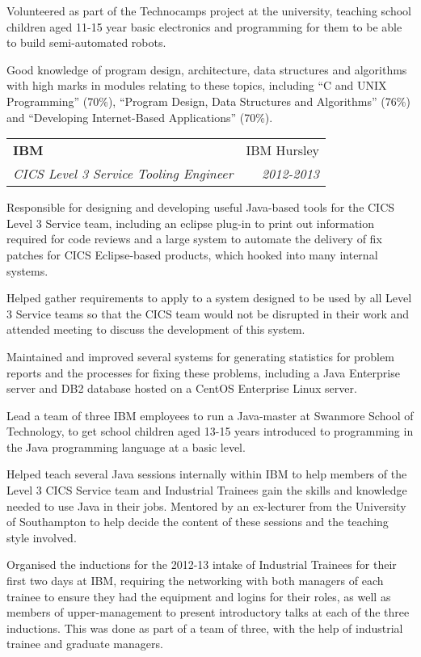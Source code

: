 \documentclass[letterpaper,11pt]{article}
\makeatletter
\newlength{\outerbordwidth}
\newcommand{\resheading}[1]{\vspace{8pt}
  \parbox{\textwidth}{\setlength{\FrameSep}{\outerbordwidth}
    \begin{shaded}
\setlength{\fboxsep}{0pt}\framebox[\textwidth][l]{\setlength{\fboxsep}{4pt}\fcolorbox{shadecolorB}{shadecolorB}{\textbf{\sffamily{\mbox{~}\makebox[6.762in][l]{\large #1} \vphantom{p\^{E}}}}}}
    \end{shaded}
  }\vspace{-5pt}
}
\newcommand{\ressubheading}[4]{
\begin{tabular*}{6.5in}{l@{\cftdotfill{\cftsecdotsep}\extracolsep{\fill}}r}
		\textbf{#1} & #2 \\
		\textit{#3} & \textit{#4} \\
\end{tabular*}\vspace{-6pt}}
\makeatother
\begin{document}
Volunteered as part of the Technocamps project at the university, teaching school children aged 11-15 year basic electronics and programming for them to be able to build semi-automated robots.

Good knowledge of program design, architecture, data structures and algorithms with high marks in modules relating to these topics, including ``C and UNIX Programming'' (70\%), ``Program Design, Data Structures and Algorithms'' (76\%) and ``Developing Internet-Based Applications'' (70\%).




\resheading{Work Experience}
\ressubheading{IBM}{IBM Hursley}{CICS Level 3 Service Tooling Engineer}{2012-2013}
\vspace{10pt}

Responsible for designing and developing useful Java-based tools for the CICS Level 3 Service team, including an eclipse plug-in to print out information required for code reviews and a large system to automate the delivery of fix patches for CICS Eclipse-based products, which hooked into many internal systems.

Helped gather requirements to apply to a system designed to be used by all Level 3 Service teams so that the CICS team would not be disrupted in their work and attended meeting to discuss the development of this system.

Maintained and improved several systems for generating statistics for problem reports and the processes for fixing these problems, including a Java Enterprise server and DB2 database hosted on a CentOS Enterprise Linux server.

Lead a team of three IBM employees to run a Java-master at Swanmore School of Technology, to get school children aged 13-15 years introduced to programming in the Java programming language at a basic level.

Helped teach several Java sessions internally within IBM to help members of the Level 3 CICS Service team and Industrial Trainees gain the skills and knowledge needed to use Java in their jobs. Mentored by an ex-lecturer from the University of Southampton to help decide the content of these sessions and the teaching style involved.

Organised the inductions for the 2012-13 intake of Industrial Trainees for their first two days at IBM, requiring the networking with both managers of each trainee to ensure they had the equipment and logins for their roles, as well as members of upper-management to present introductory talks at each of the three inductions. This was done as part of a team of three, with the help of industrial trainee and graduate managers.
\end{document}
